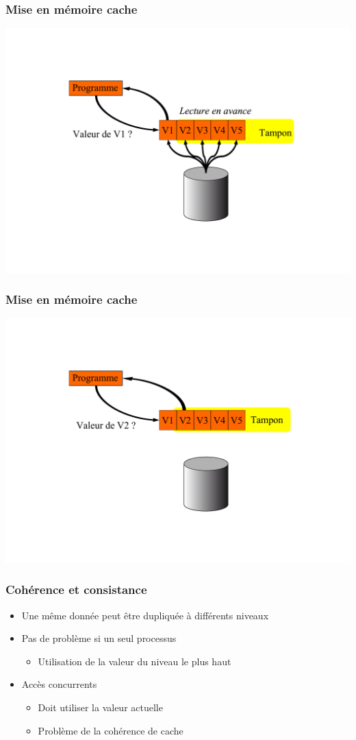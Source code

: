 \begin{frame}
\frametitle{Mise en mémoire cache}
\includegraphics[width=.9\textwidth]{../illustration/cache_lecture_en_avance.pdf}
\end{frame}


\begin{frame}
\frametitle{Mise en mémoire cache}
\includegraphics[width=.9\textwidth]{../illustration/cache_lecture_en_avance2.pdf}
\end{frame}


\begin{frame}
\frametitle{Cohérence et consistance}
\begin{itemize}
\item Une même donnée peut être dupliquée à différents niveaux
\item Pas de problème si un seul processus
\begin{itemize}
\item Utilisation de la valeur du niveau le plus haut
\end{itemize}
\item Accès concurrents
\begin{itemize}
\item Doit utiliser la valeur actuelle
\item Problème de la cohérence de cache
\end{itemize}
\end{itemize}
\end{frame}


